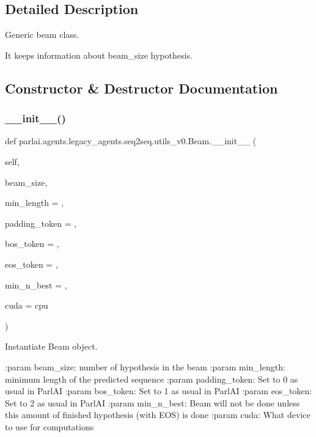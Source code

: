 \subsection{Detailed Description}
\begin{DoxyVerb}Generic beam class.

It keeps information about beam_size hypothesis.
\end{DoxyVerb}
 

\subsection{Constructor \& Destructor Documentation}
\mbox{\label{classparlai_1_1agents_1_1legacy__agents_1_1seq2seq_1_1utils__v0_1_1Beam_a0b15ba633165fe8ae84f7664dc893b99}} 
\subsubsection{\texorpdfstring{\+\_\+\+\_\+init\+\_\+\+\_\+()}{\_\_init\_\_()}}
{\footnotesize\ttfamily def parlai.\+agents.\+legacy\+\_\+agents.\+seq2seq.\+utils\+\_\+v0.\+Beam.\+\_\+\+\_\+init\+\_\+\+\_\+ (\begin{DoxyParamCaption}\item[{}]{self,  }\item[{}]{beam\+\_\+size,  }\item[{}]{min\+\_\+length = {},  }\item[{}]{padding\+\_\+token = {},  }\item[{}]{bos\+\_\+token = {},  }\item[{}]{eos\+\_\+token = {},  }\item[{}]{min\+\_\+n\+\_\+best = {},  }\item[{}]{cuda = {\ttfamily \textquotesingle{}cpu\textquotesingle{}} }\end{DoxyParamCaption})}

\begin{DoxyVerb}Instantiate Beam object.

:param beam_size: number of hypothesis in the beam
:param min_length: minimum length of the predicted sequence
:param padding_token: Set to 0 as usual in ParlAI
:param bos_token: Set to 1 as usual in ParlAI
:param eos_token: Set to 2 as usual in ParlAI
:param min_n_best: Beam will not be done unless this amount of finished
           hypothesis (with EOS) is done
:param cuda: What device to use for computations
\end{DoxyVerb}
 

